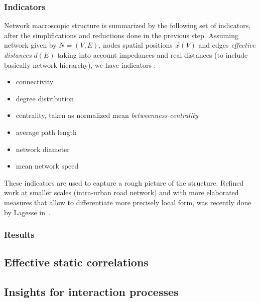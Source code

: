 

\subsubsection{Indicators}

Network macroscopic structure is summarized by the following set of indicators, after the simplifications and reductions done in the previous step. Assuming network given by $N=(V,E)$, nodes spatial positions $\vec{x}(V)$ and edges \emph{effective distances} $d(E)$ taking into account impedances and real distances (to include basically network hierarchy), we have indicators :
\begin{itemize}
\item connectivity
\item degree distribution
\item centrality, taken as normalized mean \emph{betweenness-centrality}
\item average path length
\item network diameter
\item mean network speed
\end{itemize}

These indicators are used to capture a rough picture of the structure. Refined work at smaller scales (intra-urban road network) and with more elaborated measures that allow to differentiate more precisely local form, was recently done by Lagesse in~\cite{2015arXiv151201268L}.



\subsubsection{Results}




\subsection{Effective static correlations}



\subsection{Insights for interaction processes}







